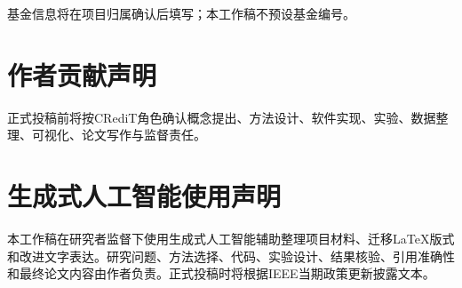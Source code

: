\documentclass[journal]{IEEEtran}
\begin{document}
基金信息将在项目归属确认后填写；本工作稿不预设基金编号。

\section*{作者贡献声明}

正式投稿前将按CRediT角色确认概念提出、方法设计、软件实现、实验、数据整理、可视化、论文写作与监督责任。

\section*{生成式人工智能使用声明}

本工作稿在研究者监督下使用生成式人工智能辅助整理项目材料、迁移LaTeX版式和改进文字表达。研究问题、方法选择、代码、实验设计、结果核验、引用准确性和最终论文内容由作者负责。正式投稿时将根据IEEE当期政策更新披露文本。



\end{document}
